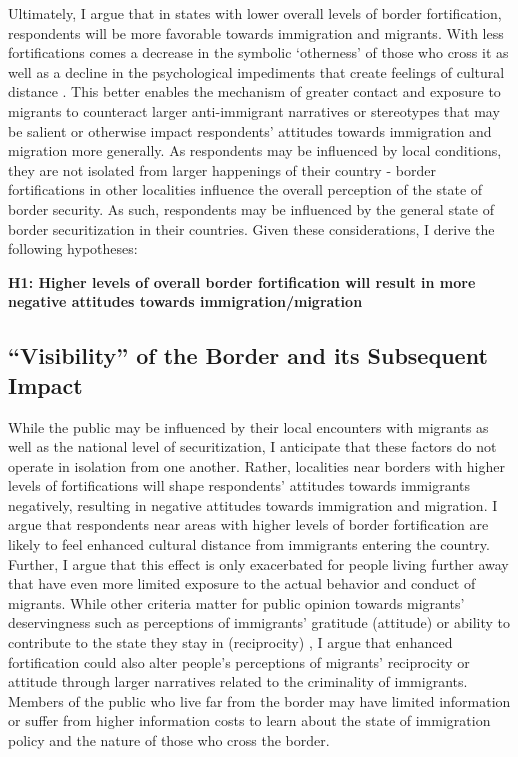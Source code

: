 \documentclass[12pt,]{article}
\begin{document}
Ultimately, I argue that in states with lower overall levels of border
fortification, respondents will be more favorable towards immigration
and migrants. With less fortifications comes a decrease in the symbolic
`otherness' of those who cross it \citep{jaramillo-dent2021} as well as
a decline in the psychological impediments that create feelings of
cultural distance \citep{mutz2022}. This better enables the mechanism of
greater contact and exposure to migrants to counteract larger
anti-immigrant narratives or stereotypes that may be salient or
otherwise impact respondents' attitudes towards immigration and
migration more generally. As respondents may be influenced by local
conditions, they are not isolated from larger happenings of their
country - border fortifications in other localities influence the
overall perception of the state of border security. As such, respondents
may be influenced by the general state of border securitization in their
countries. Given these considerations, I derive the following
hypotheses:

\textbf{H1: Higher levels of overall border fortification will result in
more negative attitudes towards immigration/migration}

\subsection{``Visibility'' of the Border and its Subsequent
Impact}\label{visibility-of-the-border-and-its-subsequent-impact}

While the public may be influenced by their local encounters with
migrants as well as the national level of securitization, I anticipate
that these factors do not operate in isolation from one another. Rather,
localities near borders with higher levels of fortifications will shape
respondents' attitudes towards immigrants negatively, resulting in
negative attitudes towards immigration and migration. I argue that
respondents near areas with higher levels of border fortification are
likely to feel enhanced cultural distance from immigrants entering the
country. Further, I argue that this effect is only exacerbated for
people living further away that have even more limited exposure to the
actual behavior and conduct of migrants. While other criteria matter for
public opinion towards migrants' deservingness such as perceptions of
immigrants' gratitude (attitude) or ability to contribute to the state
they stay in (reciprocity) \citep{deconinck2020a}, I argue that enhanced
fortification could also alter people's perceptions of migrants'
reciprocity or attitude through larger narratives related to the
criminality of immigrants. Members of the public who live far from the
border may have limited information or suffer from higher information
costs to learn about the state of immigration policy and the nature of
those who cross the border.
\end{document}
